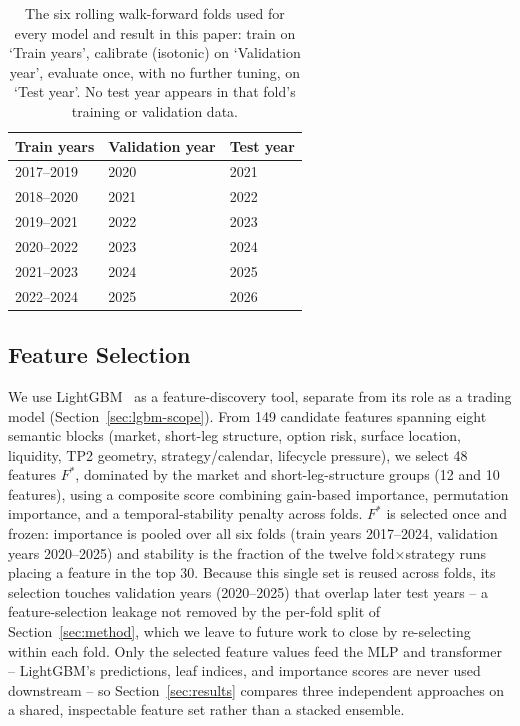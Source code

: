\documentclass[sigconf,review]{acmart}
\begin{document}
\begin{table}[H]
\centering
\footnotesize
\begin{tabular}{lll}
\toprule
Train years & Validation year & Test year \\
\midrule
2017--2019 & 2020 & 2021 \\
2018--2020 & 2021 & 2022 \\
2019--2021 & 2022 & 2023 \\
2020--2022 & 2023 & 2024 \\
2021--2023 & 2024 & 2025 \\
2022--2024 & 2025 & 2026 \\
\bottomrule
\end{tabular}
\caption{The six rolling walk-forward folds used for every model and result in this paper: train on `Train years', calibrate (isotonic) on `Validation year', evaluate once, with no further tuning, on `Test year'. No test year appears in that fold's training or validation data.}
\label{tab:folds}
\end{table}

\subsection{Feature Selection}
We use LightGBM~\cite{ke2017lightgbm} as a feature-discovery tool, separate from its role as a trading model (Section~\ref{sec:lgbm-scope}). From 149 candidate features spanning eight semantic blocks (market, short-leg structure, option risk, surface location, liquidity, TP2 geometry, strategy/calendar, lifecycle pressure), we select 48 features $F^{\ast}$, dominated by the market and short-leg-structure groups (12 and 10 features), using a composite score combining gain-based importance, permutation importance, and a temporal-stability penalty across folds. $F^{\ast}$ is selected once and frozen: importance is pooled over all six folds (train years 2017--2024, validation years 2020--2025) and stability is the fraction of the twelve fold$\times$strategy runs placing a feature in the top 30. Because this single set is reused across folds, its selection touches validation years (2020--2025) that overlap later test years -- a feature-selection leakage not removed by the per-fold split of Section~\ref{sec:method}, which we leave to future work to close by re-selecting within each fold. Only the selected feature values feed the MLP and transformer -- LightGBM's predictions, leaf indices, and importance scores are never used downstream -- so Section~\ref{sec:results} compares three independent approaches on a shared, inspectable feature set rather than a stacked ensemble.
\end{document}
